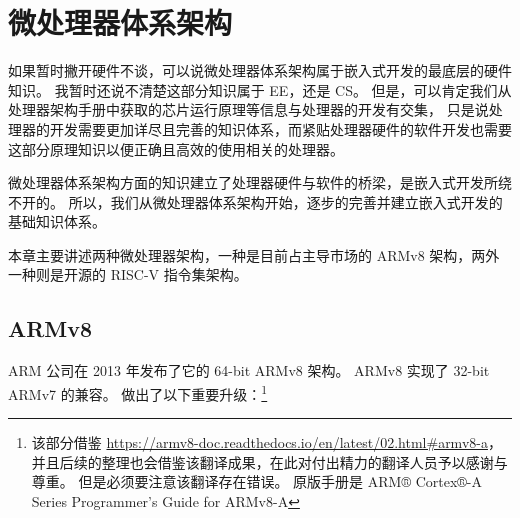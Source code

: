 \chapter{微处理器体系架构}

如果暂时撇开硬件不谈，可以说微处理器体系架构属于嵌入式开发的最底层的硬件知识。
我暂时还说不清楚这部分知识属于 EE，还是 CS。
但是，可以肯定我们从处理器架构手册中获取的芯片运行原理等信息与处理器的开发有交集，
只是说处理器的开发需要更加详尽且完善的知识体系，而紧贴处理器硬件的软件开发也需要这部分原理知识以便正确且高效的使用相关的处理器。

微处理器体系架构方面的知识建立了处理器硬件与软件的桥梁，是嵌入式开发所绕不开的。
所以，我们从微处理器体系架构开始，逐步的完善并建立嵌入式开发的基础知识体系。

本章主要讲述两种微处理器架构，一种是目前占主导市场的 ARMv8 架构，两外一种则是开源的 RISC-V 指令集架构。

\section{ARMv8}

ARM 公司在 2013 年发布了它的 64-bit ARMv8 架构。
ARMv8 实现了 32-bit ARMv7 的兼容。
做出了以下重要升级：\footnote{
  该部分借鉴 \url{https://armv8-doc.readthedocs.io/en/latest/02.html\#armv8-a}，并且后续的整理也会借鉴该翻译成果，在此对付出精力的翻译人员予以感谢与尊重。
  但是必须要注意该翻译存在错误。
  原版手册是 {ARM® Cortex®-A Series Programmer’s Guide for ARMv8-A}\cite{armpg}
}

